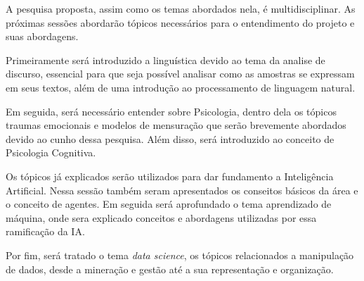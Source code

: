 A pesquisa proposta, assim como os temas abordados nela, é multidisciplinar. As próximas sessões abordarão tópicos necessários para o entendimento do projeto e suas abordagens.

Primeiramente será introduzido a linguística devido ao tema da analise de discurso, essencial para que seja possível analisar como as amostras se expressam em seus textos, além de uma introdução ao processamento de linguagem natural.

Em seguida, será necessário entender sobre Psicologia, dentro dela os tópicos traumas emocionais e modelos de mensuração que serão brevemente abordados devido ao cunho dessa pesquisa. Além disso, será introduzido ao conceito de Psicologia Cognitiva.

Os tópicos já explicados serão utilizados para dar fundamento a Inteligência Artificial. Nessa sessão também seram apresentados os conseitos básicos da área e o conceito de agentes. Em seguida será aprofundado o tema aprendizado de máquina, onde sera explicado conceitos e abordagens utilizadas por essa ramificação da IA.

Por fim, será tratado o tema \textit{data science}, os tópicos relacionados a manipulação de dados, desde a mineração e gestão até a sua representação e organização.







